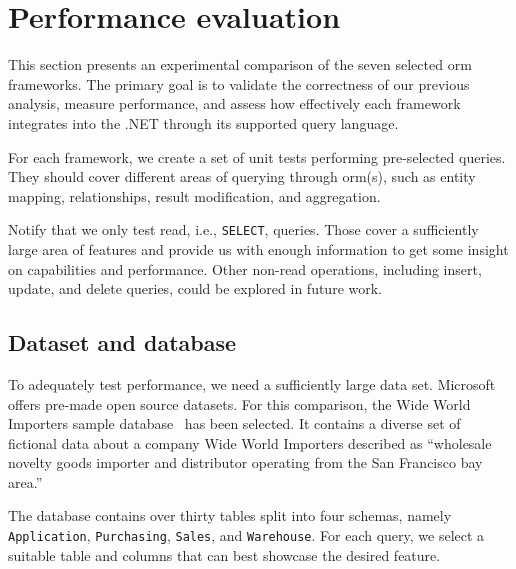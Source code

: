 \section{Performance evaluation}
\label{sec:perf_eval}

This section presents an experimental comparison of the seven selected \acrshort{orm} frameworks. The primary goal is to validate the correctness of our previous analysis, measure performance, and assess how effectively each framework integrates into the .NET through its supported query language.

For each framework, we create a set of unit tests performing pre-selected queries. They should cover different areas of querying through \acrshort{orm}(s), such as entity mapping, relationships, result modification, and aggregation.

Notify that we only test read, i.e., \texttt{SELECT}, queries. Those cover a sufficiently large area of features and provide us with enough information to get some insight on capabilities and performance. Other non-read operations, including insert, update, and delete queries, could be explored in future work.

\subsection{Dataset and database}
\label{sec:dataset_database}
To adequately test performance, we need a sufficiently large data set. Microsoft offers pre-made open source datasets.
For this comparison, the Wide World Importers sample database~\cite{microsoftWWI} has been selected.
It contains a diverse set of fictional data about a company Wide World Importers described as ``wholesale novelty goods importer and distributor operating from the San Francisco bay area.''~\cite{microsoftWWI}

The database contains over thirty tables split into four schemas, namely \texttt{Application}, \texttt{Purchasing}, \texttt{Sales}, and \texttt{Warehouse}. For each query, we select a suitable table and columns that can best showcase the desired feature.

